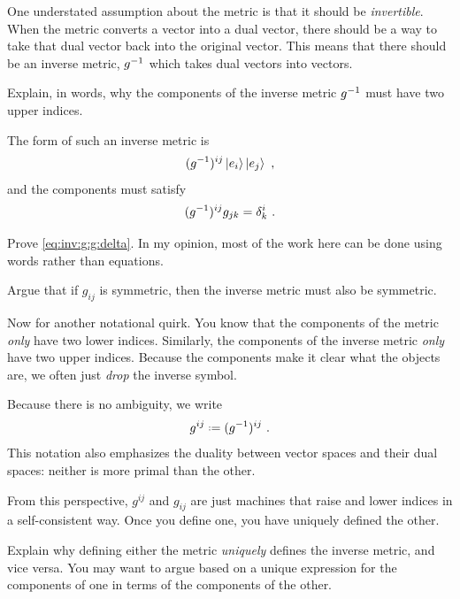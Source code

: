 \documentclass[12pt, oneside]{report}    %
\begin{document}
One understated assumption about the metric is that it should be \emph{invertible}. When the metric converts a vector into a dual vector, there should be a way to take that dual vector back into the original vector. This means that there should be an inverse metric, $g^{-1}$ which takes dual vectors into vectors.
\begin{exercise}
Explain, in words, why the components of the inverse metric $g^{-1}$ must have two upper indices. 
\end{exercise}
The form of such an inverse metric is
\begin{align}
    (g^{-1})^{ij} \left|e_i\right\rangle\left|e_j\right\rangle \ ,
\end{align}
and the components must satisfy
\begin{align}
    (g^{-1})^{ij} g_{jk} = \delta^i_k \ .
    \label{eq:inv:g:g:delta}
\end{align}
\begin{exercise}
Prove \eqref{eq:inv:g:g:delta}. In my opinion, most of the work here can be done using words rather than equations.
\end{exercise}
\begin{exercise}
Argue that if $g_{ij}$ is symmetric, then the inverse metric must also be symmetric.
\end{exercise}


Now for another notational quirk. You know that the components of the metric \emph{only} have two lower indices. Similarly, the components of the inverse metric \emph{only} have two upper indices. Because the components make it clear what the objects are, we often just \emph{drop} the inverse symbol. 
\begin{bigidea}
Because there is no ambiguity, we write
\begin{align}
    g^{ij}\defeq (g\inv)^{ij} \ .
\end{align}
This notation also emphasizes the duality between vector spaces and their dual spaces: neither is more primal than the other. 
\end{bigidea}
From this perspective, $g^{ij}$ and $g_{ij}$ are just machines that raise and lower indices in a self-consistent way. Once you define one, you have uniquely defined the other.
\begin{exercise}
Explain why defining either the metric \emph{uniquely} defines the inverse metric, and vice versa. You may want to argue based on a unique expression for the components of one in terms of the components of the other. 
\end{exercise}
\end{document}
